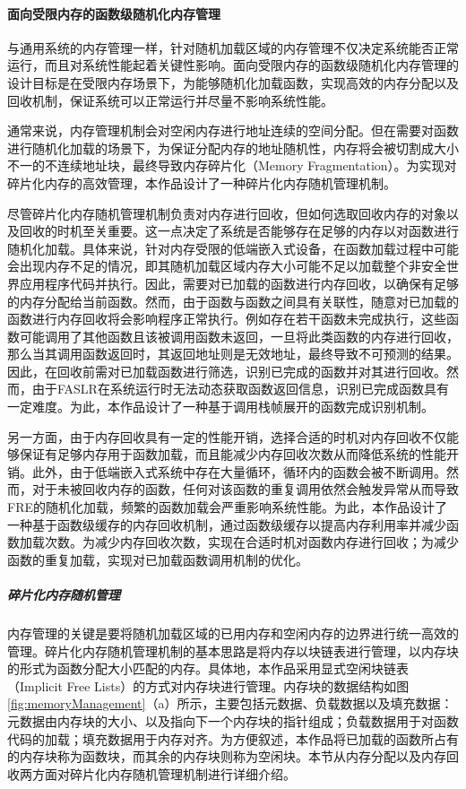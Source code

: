 \documentclass[UTF8,12pt,a4paper]{ctexart}
\numberwithin{figure}{section}
\begin{document}
\paragraph{面向受限内存的函数级随机化内存管理}
\par 与通用系统的内存管理一样，针对随机加载区域的内存管理不仅决定系统能否正常运行，而且对系统性能起着关键性影响。面向受限内存的函数级随机化内存管理的设计目标是在受限内存场景下，为能够随机化加载函数，实现高效的内存分配以及回收机制，保证系统可以正常运行并尽量不影响系统性能。
\par 通常来说，内存管理机制会对空闲内存进行地址连续的空间分配。但在需要对函数进行随机化加载的场景下，为保证分配内存的地址随机性，内存将会被切割成大小不一的不连续地址块，最终导致内存碎片化（Memory Fragmentation）。为实现对碎片化内存的高效管理，本作品设计了一种碎片化内存随机管理机制。
\par 尽管碎片化内存随机管理机制负责对内存进行回收，但如何选取回收内存的对象以及回收的时机至关重要。这一点决定了系统是否能够存在足够的内存以对函数进行随机化加载。具体来说，针对内存受限的低端嵌入式设备，在函数加载过程中可能会出现内存不足的情况，即其随机加载区域内存大小可能不足以加载整个非安全世界应用程序代码并执行。因此，需要对已加载的函数进行内存回收，以确保有足够的内存分配给当前函数。然而，由于函数与函数之间具有关联性，随意对已加载的函数进行内存回收将会影响程序正常执行。例如存在若干函数未完成执行，这些函数可能调用了其他函数且该被调用函数未返回，一旦将此类函数的内存进行回收，那么当其调用函数返回时，其返回地址则是无效地址，最终导致不可预测的结果。因此，在回收前需对已加载函数进行筛选，识别已完成的函数并对其进行回收。然而，由于FASLR在系统运行时无法动态获取函数返回信息，识别已完成函数具有一定难度。为此，本作品设计了一种基于调用栈帧展开的函数完成识别机制。
\par 另一方面，由于内存回收具有一定的性能开销，选择合适的时机对内存回收不仅能够保证有足够内存用于函数加载，而且能减少内存回收次数从而降低系统的性能开销。此外，由于低端嵌入式系统中存在大量循环，循环内的函数会被不断调用。然而，对于未被回收内存的函数，任何对该函数的重复调用依然会触发异常从而导致FRE的随机化加载，频繁的函数加载会严重影响系统性能。为此，本作品设计了一种基于函数级缓存的内存回收机制，通过函数级缓存以提高内存利用率并减少函数加载次数。为减少内存回收次数，实现在合适时机对函数内存进行回收；为减少函数的重复加载，实现对已加载函数调用机制的优化。
\subparagraph{碎片化内存随机管理}
\par 内存管理的关键是要将随机加载区域的已用内存和空闲内存的边界进行统一高效的管理。碎片化内存随机管理机制的基本思路是将内存以块链表进行管理，以内存块的形式为函数分配大小匹配的内存。具体地，本作品采用显式空闲块链表（Implicit Free Lists）的方式对内存块进行管理。内存块的数据结构如图\ref{fig:memoryManagement}（a）所示，主要包括元数据、负载数据以及填充数据：元数据由内存块的大小、以及指向下一个内存块的指针组成；负载数据用于对函数代码的加载；填充数据用于内存对齐。为方便叙述，本作品将已加载的函数所占有的内存块称为函数块，而其余的内存块则称为空闲块。本节从内存分配以及内存回收两方面对碎片化内存随机管理机制进行详细介绍。
\end{document}
